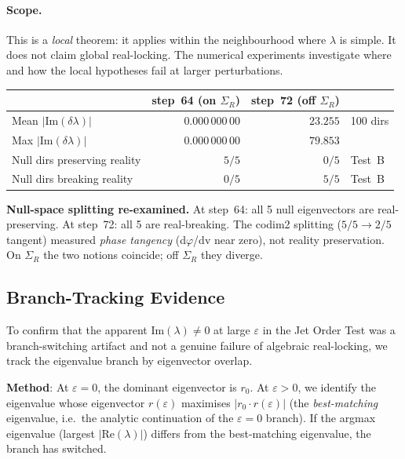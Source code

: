 \documentclass[11pt]{amsart}
\begin{document}
\paragraph{Scope.}
This is a \emph{local} theorem: it applies within the neighbourhood
where $\lambda$ is simple.
It does not claim global real-locking.
The numerical experiments investigate where and how the local hypotheses
fail at larger perturbations.

\begin{center}\small
\begin{tabular}{@{}lrrl@{}}
\toprule
 & step~64 (on $\Sigma_R$) & step~72 (off $\Sigma_R$) & \\
\midrule
Mean $|\mathrm{Im}(\delta\lambda)|$ & $0.000\,000\,00$ & $23.255$ & 100 dirs \\
Max  $|\mathrm{Im}(\delta\lambda)|$ & $0.000\,000\,00$ & $79.853$ & \\
Null dirs preserving reality & $5/5$ & $0/5$ & Test~B \\
Null dirs breaking reality   & $0/5$ & $5/5$ & Test~B \\
\bottomrule
\end{tabular}
\end{center}

\textbf{Null-space splitting re-examined.}
At step~64: all 5 null eigenvectors are real-preserving.
At step~72: all 5 are real-breaking.
The codim2 splitting ($5/5 \to 2/5$ tangent) measured \emph{phase
tangency} (d$\varphi$/dv near zero), not reality preservation.
On $\Sigma_R$ the two notions coincide; off $\Sigma_R$ they diverge.


\subsection{Branch-Tracking Evidence}
\label{sec:branch_tracking}

To confirm that the apparent $\mathrm{Im}(\lambda) \neq 0$ at large
$\varepsilon$ in the Jet Order Test was a branch-switching artifact
and not a genuine failure of algebraic real-locking, we track the
eigenvalue branch by eigenvector overlap.

\textbf{Method}: At $\varepsilon=0$, the dominant eigenvector is $r_0$.
At $\varepsilon > 0$, we identify the eigenvalue whose eigenvector
$r(\varepsilon)$ maximises $|r_0 \cdot r(\varepsilon)|$
(the \emph{best-matching} eigenvalue, i.e.\ the analytic continuation
of the $\varepsilon=0$ branch).
If the argmax eigenvalue (largest $|\mathrm{Re}(\lambda)|$) differs from
the best-matching eigenvalue, the branch has switched.
\end{document}
